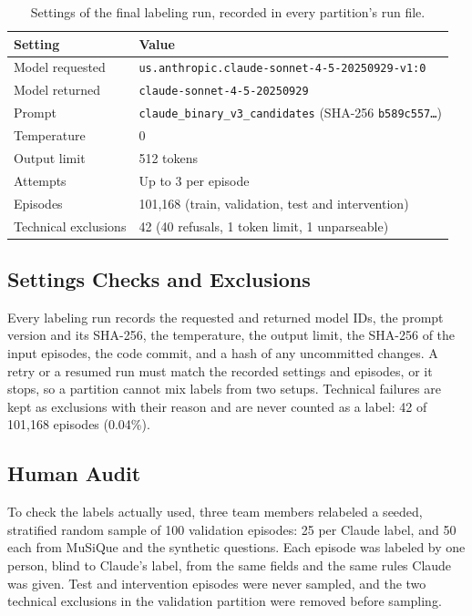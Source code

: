 \begin{table}[htbp]
    \centering
    \caption{Settings of the final labeling run, recorded in every partition's
    run file.}
    \label{tab:labeler-settings}
    \begin{tabular}{ll}
        \toprule
        Setting & Value \\
        \midrule
        Model requested & \texttt{us.anthropic.claude-sonnet-4-5-20250929-v1:0} \\
        Model returned  & \texttt{claude-sonnet-4-5-20250929} \\
        Prompt          & \texttt{claude\_binary\_v3\_candidates} (SHA-256 \texttt{b589c557\ldots}) \\
        Temperature     & 0 \\
        Output limit    & 512 tokens \\
        Attempts        & Up to 3 per episode \\
        Episodes        & 101,168 (train, validation, test and intervention) \\
        Technical exclusions & 42 (40 refusals, 1 token limit, 1 unparseable) \\
        \bottomrule
    \end{tabular}
\end{table}

\subsection{Settings Checks and Exclusions}

Every labeling run records the requested and returned model IDs, the prompt
version and its SHA-256, the temperature, the output limit, the SHA-256 of the
input episodes, the code commit, and a hash of any uncommitted changes. A
retry or a resumed run must match the recorded settings and episodes, or it
stops, so a partition cannot mix labels from two setups. Technical failures
are kept as exclusions with their reason and are never counted as a label:
42 of 101,168 episodes (0.04\%).

\subsection{Human Audit}
\label{sec:human-audit}

To check the labels actually used, three team members relabeled a seeded,
stratified random sample of 100 validation episodes: 25 per Claude label, and
50 each from MuSiQue and the synthetic questions. Each episode was labeled by
one person, blind to Claude's label, from the same fields and the same rules
Claude was given. Test and intervention episodes were never sampled, and the
two technical exclusions in the validation partition were removed before
sampling.


